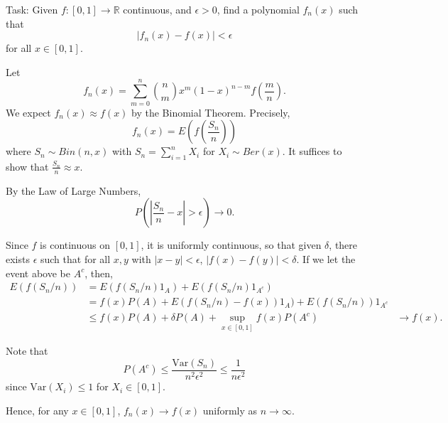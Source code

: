 \documentclass[11pt]{scrartcl}
\newcommand{\R}{\mathbb{R}}
\begin{document}
\begin{example}
Task: Given $f:[0, 1] \rightarrow \R$ continuous, and $\epsilon > 0$, find a polynomial $f_n(x)$ such that 
$$|f_n(x) - f(x)| < \epsilon$$
for all $x \in [0, 1]$.

Let $$f_n(x) = \sum_{m=0}^n \binom{n}{m}x^m(1-x)^{n-m}f\left (\frac{m}{n}\right ).$$
We expect $f_n(x) \approx f(x)$ by the Binomial Theorem.  Precisely,
$$f_n(x) = E\left (f\left (\frac{S_n}{n}\right )\right )$$
where $S_n \sim Bin(n, x)$ with $S_n = \sum_{i=1}^n X_i$ for $X_i \sim Ber(x)$.  It suffices to show that $\frac{S_n}{n} \approx x$.

By the Law of Large Numbers,
$$P\left (\left |\frac{S_n}{n} - x\right | > \epsilon\right ) \rightarrow 0.$$

Since $f$ is continuous on $[0, 1]$, it is uniformly continuous, so that given $\delta$, there exists $\epsilon$ such that for all $x, y$ with $|x - y| < \epsilon$, $|f(x)- f(y)| < \delta$.  If we let the event above be $A^c$, then, 
\begin{align*}
E(f(S_n/n)) &= E(f(S_n/n)1_A) + E(f(S_n/n)1_{A^c}) \\
&= f(x)P(A) + E(f(S_n/n) - f(x))1_A) + E(f(S_n/n))1_{A^c} \\
& \le f(x)P(A) + \delta P(A) + \sup_{x \in [0, 1]} f(x)P(A^c)
&\rightarrow f(x).
\end{align*}

Note that $$P(A^c) \le \frac{\text{Var}(S_n)}{n^2 \epsilon^2} \le \frac{1}{n\epsilon^2}$$
since $\text{Var}(X_i) \le 1$ for $X_i \in [0, 1]$.

Hence, for any $x \in [0, 1]$, $f_n(x) \rightarrow f(x)$ uniformly as $n \rightarrow \infty$.
 \end{example}
 
\end{document}
